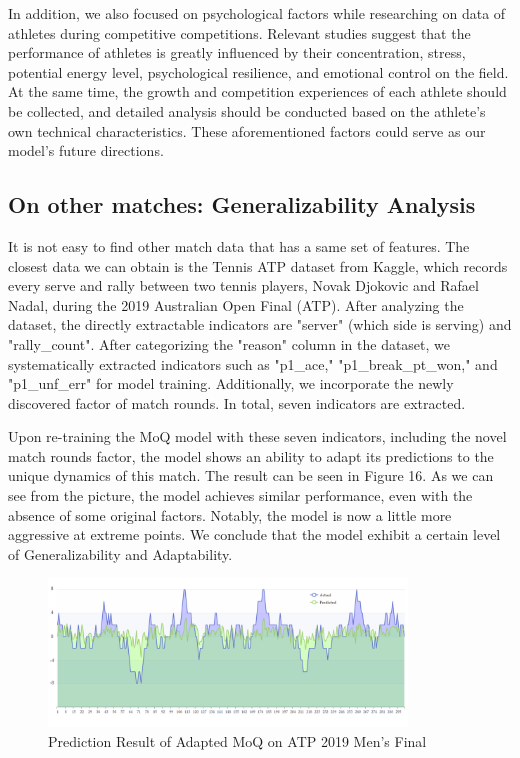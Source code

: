 \documentclass[12pt]{article}  %
\begin{document}
In addition, we also focused on psychological factors while researching on data of athletes during competitive competitions. Relevant studies suggest that the performance of athletes is greatly influenced by their concentration, stress, potential energy level, psychological resilience, and emotional control on the field. At the same time, the growth and competition experiences of each athlete should be collected, and detailed analysis should be conducted based on the athlete's own technical characteristics. These aforementioned factors could serve as our model's future directions.

\subsection{On other matches: Generalizability Analysis}
It is not easy to find other match data that has a same set of features. The closest data we can obtain is the Tennis ATP dataset from Kaggle\cite{16}, which records every serve and rally between two tennis players, Novak Djokovic and Rafael Nadal, during the 2019 Australian Open Final (ATP). After analyzing the dataset, the directly extractable indicators are "server" (which side is serving) and "rally\_count". After categorizing the "reason" column in the dataset, we systematically extracted indicators such as "p1\_ace," "p1\_break\_pt\_won," and "p1\_unf\_err" for model training. Additionally, we incorporate the newly discovered factor of match rounds. In total, seven indicators are extracted.

Upon re-training the MoQ model with these seven indicators, including the novel match rounds factor, the model shows an ability to adapt its predictions to the unique dynamics of this match. The result can be seen in Figure 16. As we can see from the picture, the model achieves similar performance, even with the absence of some original factors. Notably, the model is now a little more aggressive at extreme points. We conclude that the model exhibit a certain level of Generalizability and Adaptability.

\begin{figure}[htbp]  %
	\centering  %
	\includegraphics[width=0.85\textwidth]{new.png} %
	\caption{Prediction Result of Adapted MoQ on ATP 2019 Men's Final} %
\end{figure}
\vspace{-0.2cm}
\end{document}
